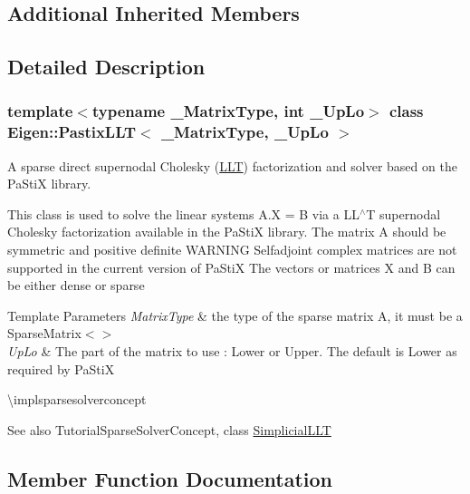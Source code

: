 \subsection*{Additional Inherited Members}


\subsection{Detailed Description}
\subsubsection*{template$<$typename \+\_\+\+Matrix\+Type, int \+\_\+\+Up\+Lo$>$\newline
class Eigen\+::\+Pastix\+L\+L\+T$<$ \+\_\+\+Matrix\+Type, \+\_\+\+Up\+Lo $>$}

A sparse direct supernodal Cholesky (\mbox{\hyperlink{class_eigen_1_1_l_l_t}{L\+LT}}) factorization and solver based on the Pa\+StiX library. 

This class is used to solve the linear systems A.\+X = B via a L\+L$^\wedge$T supernodal Cholesky factorization available in the Pa\+StiX library. The matrix A should be symmetric and positive definite W\+A\+R\+N\+I\+NG Selfadjoint complex matrices are not supported in the current version of Pa\+StiX The vectors or matrices X and B can be either dense or sparse


\begin{DoxyTemplParams}{Template Parameters}
{\em Matrix\+Type} & the type of the sparse matrix A, it must be a Sparse\+Matrix$<$$>$ \\
\hline
{\em Up\+Lo} & The part of the matrix to use \+: Lower or Upper. The default is Lower as required by Pa\+StiX\\
\hline
\end{DoxyTemplParams}
\textbackslash{}implsparsesolverconcept

\begin{DoxySeeAlso}{See also}
Tutorial\+Sparse\+Solver\+Concept, class \mbox{\hyperlink{class_eigen_1_1_simplicial_l_l_t}{Simplicial\+L\+LT}} 
\end{DoxySeeAlso}


\subsection{Member Function Documentation}
\mbox{\label{class_eigen_1_1_pastix_l_l_t_a671e8444ae2f04db3565e35caa958667}} 
